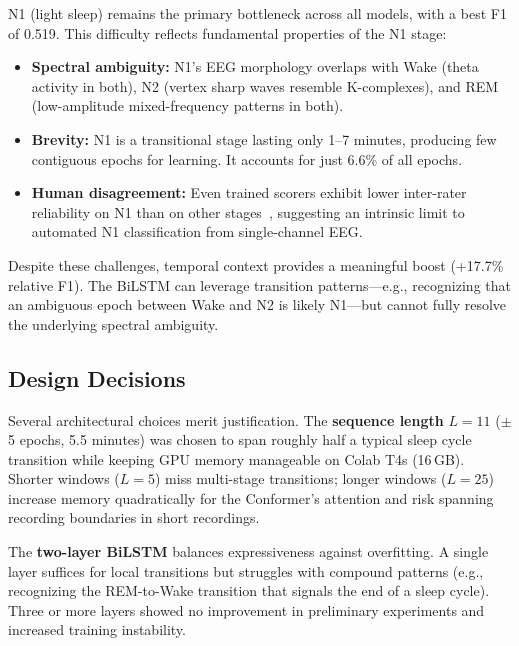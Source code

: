 \documentclass[final]{article}
\begin{document}
N1 (light sleep) remains the primary bottleneck across all models, with a best F1 of 0.519. This difficulty reflects fundamental properties of the N1 stage:

\begin{itemize}[nosep, leftmargin=*]
  \item \textbf{Spectral ambiguity:} N1's EEG morphology overlaps with Wake (theta activity in both), N2 (vertex sharp waves resemble K-complexes), and REM (low-amplitude mixed-frequency patterns in both).
  \item \textbf{Brevity:} N1 is a transitional stage lasting only 1--7 minutes, producing few contiguous epochs for learning. It accounts for just 6.6\% of all epochs.
  \item \textbf{Human disagreement:} Even trained scorers exhibit lower inter-rater reliability on N1 than on other stages~\cite{Rosenberg2013}, suggesting an intrinsic limit to automated N1 classification from single-channel EEG.
\end{itemize}

Despite these challenges, temporal context provides a meaningful boost (+17.7\% relative F1). The BiLSTM can leverage transition patterns---e.g., recognizing that an ambiguous epoch between Wake and N2 is likely N1---but cannot fully resolve the underlying spectral ambiguity.

\subsection{Design Decisions}

Several architectural choices merit justification. The \textbf{sequence length} $L = 11$ ($\pm$5 epochs, 5.5 minutes) was chosen to span roughly half a typical sleep cycle transition while keeping GPU memory manageable on Colab T4s (16\,GB). Shorter windows ($L = 5$) miss multi-stage transitions; longer windows ($L = 25$) increase memory quadratically for the Conformer's attention and risk spanning recording boundaries in short recordings.

The \textbf{two-layer BiLSTM} balances expressiveness against overfitting. A single layer suffices for local transitions but struggles with compound patterns (e.g., recognizing the REM-to-Wake transition that signals the end of a sleep cycle). Three or more layers showed no improvement in preliminary experiments and increased training instability.
\end{document}
